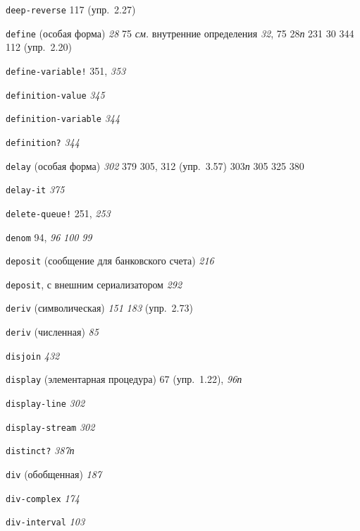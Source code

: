 \begin{theindex}
\item {\texttt{deep-reverse}} 117 (упр.~2.27)
\item {\texttt{define} (особая форма)} {\it 28}
   75
   {\it см.} внутренние определения
   {\it 32}, 75
   28{\it п}
   231
   30
   344
   112 (упр.~2.20)
\item {\texttt{define-variable!}} 351, {\it 353}
\item {\texttt{definition-value}} {\it 345}
\item {\texttt{definition-variable}} {\it 344}
\item {\texttt{definition?}} {\it 344}
\item {\texttt{delay} (особая форма)} {\it 302}
   379
   305, 312 (упр.~3.57)
   303{\it п}
   305
   325
   380
\item {\texttt{delay-it}} {\it 375}
\item {\texttt{delete-queue!}} 251, {\it 253}
\item {\texttt{denom}} 94, {\it 96}
   {\it 100}
   {\it 99}
\item {\texttt{deposit} (сообщение для банковского счета)} {\it 216}
\item {\texttt{deposit}, с внешним сериализатором} {\it 292}
\item {\texttt{deriv} (символическая)} {\it 151}
   {\it 183} (упр.~2.73)
\item {\texttt{deriv} (численная)} {\it 85}
\item {\texttt{disjoin}} {\it 432}
\item {\texttt{display} (элементарная процедура)} 67 (упр.~1.22), {\it 96}{\it п}
\item {\texttt{display-line}} {\it 302}
\item {\texttt{display-stream}} {\it 302}
\item {\texttt{distinct?}} {\it 387}{\it п}
\item {\texttt{div} (обобщенная)} {\it 187}
\item {\texttt{div-complex}} {\it 174}
\item {\texttt{div-interval}} {\it 103}

\end{theindex}
